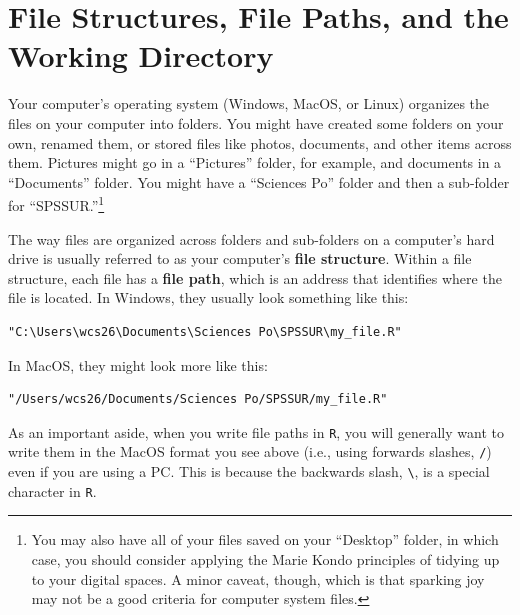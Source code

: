 \documentclass[
  letterpaper,
]{book}
\begin{document}
\hypertarget{file-structures-file-paths-and-the-working-directory}{%
\section{File Structures, File Paths, and the Working
Directory}\label{file-structures-file-paths-and-the-working-directory}}

Your computer's operating system (Windows, MacOS, or Linux) organizes
the files on your computer into folders. You might have created some
folders on your own, renamed them, or stored files like photos,
documents, and other items across them. Pictures might go in a
``Pictures'' folder, for example, and documents in a ``Documents''
folder. You might have a ``Sciences Po'' folder and then a sub-folder
for ``SPSSUR.''\footnote{You may also have all of your files saved on
  your ``Desktop'' folder, in which case, you should consider applying
  the Marie Kondo principles of tidying up to your digital spaces. A
  minor caveat, though, which is that sparking joy may not be a good
  criteria for computer system files.}

The way files are organized across folders and sub-folders on a
computer's hard drive is usually referred to as your computer's
\textbf{file structure}. Within a file structure, each file has a
\textbf{file path}, which is an address that identifies where the file
is located. In Windows, they usually look something like this:

\begin{verbatim}
"C:\Users\wcs26\Documents\Sciences Po\SPSSUR\my_file.R"
\end{verbatim}

In MacOS, they might look more like this:

\begin{verbatim}
"/Users/wcs26/Documents/Sciences Po/SPSSUR/my_file.R"
\end{verbatim}

As an important aside, when you write file paths in \texttt{R}, you will
generally want to write them in the MacOS format you see above (i.e.,
using forwards slashes, \texttt{/}) even if you are using a PC. This is
because the backwards slash, \texttt{\textbackslash{}}, is a special
character in \texttt{R}.
\end{document}
